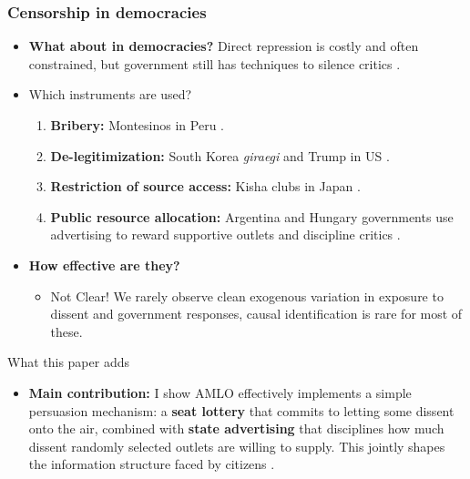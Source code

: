\documentclass[10pt,aspectratio=169]{beamer}
\begin{document}
\begin{frame}
\frametitle{Censorship in democracies}

\begin{itemize}
 \item \textbf{What about in democracies?}
    Direct repression is costly and often constrained, but government still has techniques to silence critics {\footnotesize\color{gray}\citep{Censor-Pratt-AER}}.
    \vspace{0.2cm}
\item Which instruments are used?

\begin{enumerate}
    \item \textbf{Bribery:} Montesinos in Peru {\footnotesize\color{gray}\citep{Peru-Macmillan-JEP}}.
    \item \textbf{De-legitimization:} South Korea \textit{giraegi} and Trump in US {\footnotesize\color{gray}\citep{KoreaJour-Shin-Journalism, PressCriticism-Carlson-Journalism}}.
    \item \textbf{Restriction of source access:} Kisha clubs in Japan {\footnotesize\color{gray}\citep{Kisha-Freedom}}.
    \item \textbf{Public resource allocation:} Argentina and Hungary governments use \alert{advertising} to \alert{reward} supportive outlets and \alert{discipline} critics {\footnotesize\color{gray}\citep{ArgCorr-DiTella-AEJAE, MediaCaptures-Zeidl-Econometrica}}.
\end{enumerate}

\vspace{0.2cm}
\item \textbf{How effective are they?}
\begin{itemize}
  \item \alert{Not Clear!} We rarely observe clean exogenous variation in exposure to dissent and government responses, causal identification is rare for most of these.
\end{itemize}
\end{itemize}
\end{frame}

\begin{frame}{What this paper adds}
\begin{itemize}\setlength\itemsep{0.85em}

  \item \textbf{Main contribution:}
  I show AMLO effectively implements a \alert{simple persuasion mechanism}:
  a \textbf{seat lottery} that commits to letting some dissent onto the air, combined with \textbf{state advertising}
  that disciplines how much dissent randomly selected outlets are willing to supply.
  This jointly shapes the information structure faced by citizens
  {\footnotesize\color{gray}\citep{MediaBias-Gentzkow-JPE}}.

\end{itemize}
\end{frame}
\end{document}
